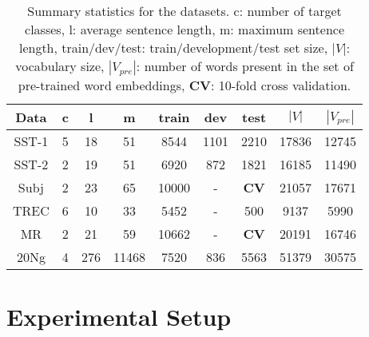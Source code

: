 \documentclass[11pt]{article}
\begin{document}
\begin{table*}[!t]
\centering
\begin{tabular}{c||c|c|c|c|c|c|c|c}
\hline
{\bf{Data}} & {c} & {l} & {m} & {train} & {dev} & {test} & {$|V|$} & {$|V_{pre}|$} \\

\hline
SST-1    &5    &18    &51    &8544    &1101    &2210    &17836    &12745\\
SST-2    &2    &19    &51    &6920    &872    &1821    &16185    &11490\\
Subj    &2    &23    &65    &10000    &-    &\textbf{CV}    &21057    &17671\\
TREC    &6    &10    &33    &5452    &-    &500    &9137    &5990\\
MR    &2    &21    &59    &10662    &-    &\textbf{CV}    &20191    &16746\\
20Ng    &4    &276    &11468    &7520    &836    &5563    &51379    &30575\\
\hline
\end{tabular}
\caption{Summary statistics for the datasets. c: number of target classes, l: average sentence length, m: maximum sentence length, train/dev/test: train/development/test set size, $|V|$: vocabulary size, $|V_{pre}|$: number of words present in the set of pre-trained word embeddings, \textbf{CV}: 10-fold cross validation.}\label{tab:result}
\end{table*}

\section{Experimental Setup}
\end{document}
